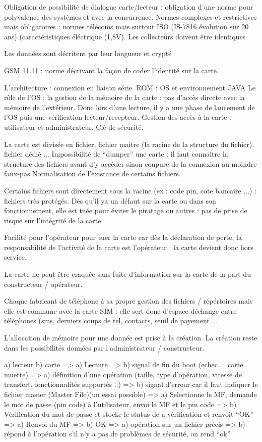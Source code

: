 \documentclass[a4paper,12pt]{article}
\begin{document}
Obligation de possibilité de dialogue carte/lecteur : obligation d'une norme pour polyvalence des systèmes et avec la concurrence.
Normes complexes et restrictives mais obligatoires : normes télécoms mais surtout ISO (IS-7816 évolution sur 20 ans) (caractéristiques éléctrique (1,8V). Les collecteurs doivent être identiques

Les données sont décritent par leur longueur et crypté

GSM 11.11 : norme décrivant la façon de coder l'identité sur la carte.

L'architecture : connexion en liaison série.
ROM : OS et environnement JAVA
Le rôle de l'OS : la gestion de la mémoire de la carte : pas d'accès directe avec la mémoire de l'extérieur.
Donc lors d'une lecture, il y a une phase de lancement de l'OS puis une vérification lecteur/recepteur.
Gestion des accès à la carte : utilisateur et administrateur. Clé de sécurité.

La carte est divisée en fichier, fichier maitre (la racine de la structure du fichier), fichier dédié ...
Impossibilité de ``dumper'' une carte : il faut connaitre la structure des fichiers avant d'y accéder sinon coupure de la connexion au moindre faux-pas
Normalisation de l'existance de certains fichiers. 

Certains fichiers sont directement sous la racine (ex : code pin, cote bancaire ...) : fichiers très protégés.
Dès qu'il ya un défaut sur la carte ou dans son fonctionnement, elle est tuée pour éviter le piratage ou autres : pas de prise de risque sur l'intégrité de la carte.

Facilité pour l'opérateur pour tuer la carte car dès la déclaration de perte, la responsabilité de l'activité de la carte est l'opérateur : la carte devient donc hors service.

La carte ne peut être craquée sans fuite d'information sur la carte de la part du constructeur / opérateur.

Chaque fabricant de téléphone à sa propre gestion des fichiers / répértoires mais elle est commune avec la carte SIM : elle sert donc d'espace déchange entre téléphones (sms, derniers coups de tel, contacts, seuil de payement ...

L'allocation de mémoire pour une donnée est prise à la création. La création reste dans les possibilités données par l'administrateur / constructeur.


a) lecteur
b) carte
=> a) Lecture 
=> b) signal de fin du boot (echec = carte muette) 
=> a) définition d'une opération (taille, type d'opération, vitesse de transfert, fonctionnalités supportés ..) 
=> b) signal d'erreur car il faut indiquer le fichier master (Master File)(un essai possible) 
=> a) Selectionne le MF, demande le mot de passe (pin code) à l'utilisateur, envoi le MF et le pin code 
=> b) Vérification du mot de passe et stocke le status de a vérification et renvoit ``OK''
=> a) Renvoi du MF
=> b) OK
=> a) opération sur un fichier précis
=> b) répond à l'opération s'il n'y a pas de problèmes de sécurité, on rend ``ok''
\end{document}
